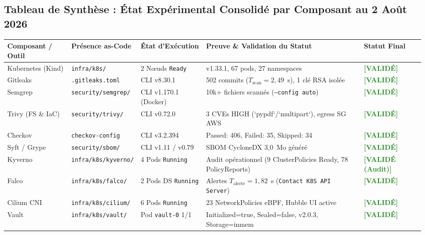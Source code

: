 \subsection{Tableau de Synthèse : État Expérimental Consolidé par Composant au 2 Août 2026}

\begin{table}[H]
\centering
\scriptsize
\begin{tabular}{@{}p{2.6cm}p{2.2cm}p{2.2cm}p{4.8cm}p{2.0cm}@{}}
\toprule
\textbf{Composant / Outil} & \textbf{Présence as-Code} & \textbf{État d'Exécution} & \textbf{Preuve \& Validation du Statut} & \textbf{Statut Final} \\
\midrule
Kubernetes (Kind) & \texttt{infra/k8s/} & 2 Nœuds \texttt{Ready} & v1.33.1, 67 pods, 27 namespaces & \textcolor{ForestGreen}{\textbf{[VALIDÉ]}} \\
Gitleaks & \texttt{.gitleaks.toml} & CLI v8.30.1 & 502 commits ($T_{\text{scan}} = 2,49$~s), 1 clé RSA isolée & \textcolor{ForestGreen}{\textbf{[VALIDÉ]}} \\
Semgrep & \texttt{security/semgrep/} & CLI v1.170.1 (Docker) & 10k+ fichiers scannés (\texttt{--config auto}) & \textcolor{ForestGreen}{\textbf{[VALIDÉ]}} \\
Trivy (FS \& IaC) & \texttt{security/trivy/} & CLI v0.72.0 & 3 CVEs HIGH (`pypdf`/`multipart`), egress SG AWS & \textcolor{ForestGreen}{\textbf{[VALIDÉ]}} \\
Checkov & \texttt{checkov-config} & CLI v3.2.394 & Passed: 406, Failed: 35, Skipped: 34 & \textcolor{ForestGreen}{\textbf{[VALIDÉ]}} \\
Syft / Grype & \texttt{security/sbom/} & CLI v1.11 / v0.79 & SBOM CycloneDX 3,0~Mo généré & \textcolor{ForestGreen}{\textbf{[VALIDÉ]}} \\
Kyverno & \texttt{infra/k8s/kyverno/} & 4 Pods \texttt{Running} & Audit opérationnel (9 ClusterPolicies Ready, 78 PolicyReports) & \textcolor{ForestGreen}{\textbf{[VALIDÉ (Audit)]}} \\
Falco & \texttt{infra/k8s/falco/} & 2 Pods DS \texttt{Running} & Alertes $T_{\text{alerte}} = 1,82$~s (\texttt{Contact K8S API Server}) & \textcolor{ForestGreen}{\textbf{[VALIDÉ]}} \\
Cilium CNI & \texttt{infra/k8s/cilium/} & 6 Pods \texttt{Running} & 23 NetworkPolicies eBPF, Hubble UI active & \textcolor{ForestGreen}{\textbf{[VALIDÉ]}} \\
Vault & \texttt{infra/k8s/vault/} & Pod \texttt{vault-0} 1/1 & Initialized=true, Sealed=false, v2.0.3, Storage=inmem & \textcolor{ForestGreen}{\textbf{[VALIDÉ]}} \\

\end{tabular}
\end{table}
